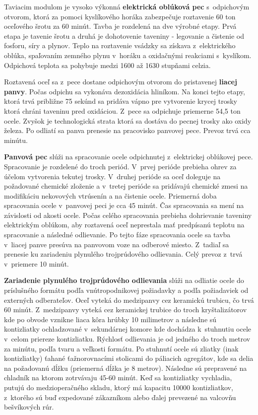 \documentclass[]{article}
\begin{document}
Taviacim modulom je vysoko výkonná \textbf{elektrická oblúková pec} s~odpichovým otvorom, ktorá  za pomoci kyslíkového horáka zabezpečuje roztavenie 60 ton oceľového šrotu za 60 minút. Tavba je rozdelená na dve výrobné etapy. Prvá etapa je tavenie šrotu a druhá je dohotovenie taveniny - legovanie a čistenie od fosforu, síry a plynov. Teplo na roztavenie vsádzky sa získava z~elektrického oblúka, spaľovaním zemného plynu v~horáku a oxidačnými reakciami s~kyslíkom. Odpichová teplota sa pohybuje medzi 1600 až 1630 stupňami celzia.

Roztavená oceľ sa z~pece dostane odpichovým otvorom do pristavenej \textbf{liacej panvy}. Počas odpichu sa vykonáva dezoxidácia hliníkom. Na konci tejto etapy, ktorá trvá približne 75 sekúnd sa pridáva vápno pre vytvorenie krycej trosky ktorá chráni taveninu pred oxidáciou. Z~pece sa odpichuje priemerne 54,5 ton ocele. Zvyšok je technologická strata ktorá sa dostáva do pecnej trosky ako oxidy železa. Po odliatí sa panva prenesie na pracovisko panvovej pece. Prevoz trvá cca minútu.

\textbf{Panvová pec} slúži na spracovanie ocele odpichnutej z~elektrickej oblúkovej pece. Spracovanie je rozdelené do troch periód. V~prvej perióde prebieha ohrev za účelom vytvorenia tekutej trosky. V~druhej perióde sa oceľ doleguje na požadované chemické zloženie a v~tretej perióde sa pridávajú chemické zmesi na modifikáciu nekovových vtrúsenín a na čistenie ocele. Priemerná doba spracovania ocele v~panvovej peci je cca 45 minút. Čas spracovania sa mení na závislosti od akosti ocele. Počas celého spracovania prebieha dohrievanie taveniny elektrickým oblúkom, aby roztavená oceľ neprestala mať predpísanú teplotu na spracovanie a následné odlievanie. Po tejto fáze spracovania ocele sa tavba v~liacej panve presúva na panvovom voze na odberové miesto. Z~tadiaľ sa prenesie ku zariadeniu plynulého trojprúdového odlievania. Celý prevoz z~trvá v~priemere 10 minút.

\textbf{Zariadenie plynulého trojprúdového odlievania} slúži na odliatie ocele do príslušného formátu podľa vnútropodnikovej požiadavky a podľa požiadaviek od externých odberateľov. Oceľ vyteká do medzipanvy cez keramickú trubicu, čo trvá 60 minút. Z~medzipanvy vyteká cez keramickej trubice do troch kryštalizátorov kde po obvode vznikne liaca kôra hrúbky 10 milimetrov a následne sú kontizliatky ochladzované v~sekundárnej komore kde dochádza k~stuhnutiu ocele v~celom priereze kontizliatku. Rýchlosť odlievania je od jedného do troch metrov za minútu, podľa tvaru a veľkosti formátu. Po stuhnutí ocele sú zliatky (inak kontizliatky) ťahané ťažnorovnacími stolicami do páliacich agregátov, kde sa delia na požadovanú dĺžku (priemerná dĺžka je 8 metrov). Následne sú prepravené na chladník na ktorom zotrvávaju 45-60 minút. Keď sa kontizliatky vychladia, putujú do medzioperačného skladu, ktorý má kapacitu 10000 kontizliatkov, z~ktorého sú buď expedované zákazníkom alebo ďalej prevezené na valcovňu bešvíkových rúr.
\end{document}
